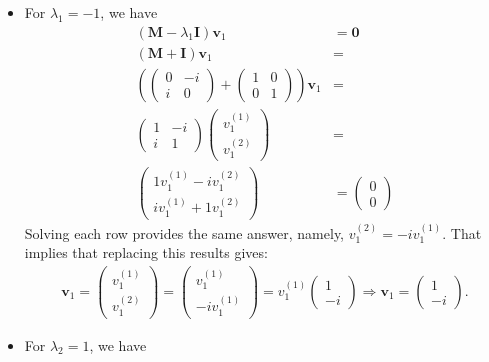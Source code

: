 \documentclass[letterpaper,11pt,twoside]{article}
\begin{document}
\begin{itemize}
  \item For $\lambda_1=-1$, we have
  \begin{align*}
    (\bm{M}-\lambda_1\bm{I})\bm{v}_1&=\bm{0}\\
    (\bm{M}+\bm{I})\bm{v}_1&=\\
    \left(\begin{pmatrix}
      0&-i\\i&0
    \end{pmatrix}+\begin{pmatrix}
      1&0\\0&1
    \end{pmatrix}\right)\bm{v}_1&=\\
    \begin{pmatrix}
      1&-i\\i&1
    \end{pmatrix}\begin{pmatrix}
    v_1^{(1)}\\v_1^{(2)}
    \end{pmatrix}&=\\
    \begin{pmatrix}
      1v_1^{(1)}-iv_1^{(2)}\\
      iv_1^{(1)}+1v_1^{(2)}
    \end{pmatrix}&=\begin{pmatrix}
      0\\0
    \end{pmatrix}
  \end{align*}
  Solving each row provides the same answer, namely, $v_1^{(2)}=-iv_1^{(1)}$. That implies that replacing this results gives:
  \begin{align}
    \bm{v}_1=\begin{pmatrix}
    v_1^{(1)}\\v_1^{(2)}
    \end{pmatrix}=\begin{pmatrix}
      v_1^{(1)}\\-iv_1^{(1)}
    \end{pmatrix}=v_1^{(1)}\begin{pmatrix}
      1\\-i
    \end{pmatrix}\Longrightarrow\bm{v}_1=\begin{pmatrix}
      1\\-i
    \end{pmatrix}.
  \end{align}
  \item For $\lambda_2=1$, we have

\end{itemize}
\end{document}

